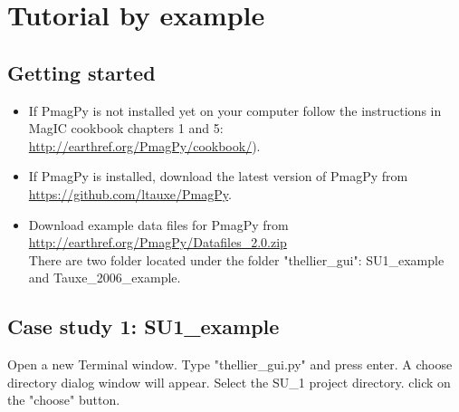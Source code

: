 \documentclass[12pt]{article}
\begin{document}
\section{ Tutorial by example}
\subsection{Getting started}

\begin{itemize}
\item If PmagPy is not installed yet on your computer follow the instructions in MagIC cookbook chapters 1 and 5:\\ \url{http://earthref.org/PmagPy/cookbook/}).
\item If PmagPy is installed, download the latest version of PmagPy from\\ \url{https://github.com/ltauxe/PmagPy}.
\item Download  example data files for PmagPy from\\  \url{http://earthref.org/PmagPy/Datafiles_2.0.zip}\\ 
 There are two folder located under the folder "thellier\_gui": SU1\_example and Tauxe\_2006\_example.
\end{itemize}
\subsection{Case study 1: SU1\_example}
Open a new Terminal window. Type "thellier\_gui.py" and press enter. A choose directory dialog window will appear. Select the SU\_1 project directory. click on the "choose" button.
\end{document}
